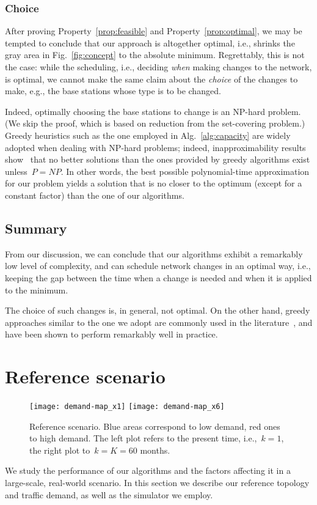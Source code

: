 \documentclass[10pt,journal,cspaper,compsoc]{IEEEtran}
\newcommand{\Fig}[1]{Fig.~\ref{fig:#1}}
\newcommand{\Alg}[1]{Alg.~\ref{alg:#1}}
\newcommand{\Prop}[1]{Property~\ref{prop:#1}}
\begin{document}
\subsubsection{Choice}

After proving \Prop{feasible} and \Prop{optimal}, we may be tempted to conclude that our approach is altogether optimal,
i.e., shrinks the gray area in \Fig{concept} to the absolute minimum. Regrettably, this is not the case: while the scheduling,
i.e., deciding {\em when} making changes to the network, is optimal, we cannot make the same claim about the {\em choice}
of the changes to make, e.g., the base stations
whose type is to be changed.

Indeed, optimally choosing the base stations to change is an NP-hard problem. (We skip the proof, which is based on reduction
from the set-covering problem.) Greedy heuristics such as the one employed in \Alg{capacity} are widely adopted when dealing with
NP-hard problems; indeed, inapproximability results show~\cite{inapprox} that no better solutions than the ones provided by greedy
algorithms exist unless~$P=NP$.
In other words, the best possible polynomial-time approximation for our problem yields a solution that is no closer to the optimum (except for a constant factor) than the one of our algorithms.

\subsection{Summary}

From our discussion, we can conclude that our algorithms exhibit a remarkably low level of complexity, and can schedule
network changes in an optimal way, i.e., keeping the gap between the time when a change is needed and when it is applied to the
minimum.

The choice of such changes is, in general, not optimal. On the other hand, greedy approaches similar to
the one we adopt are commonly used in the literature~\cite{inapprox}, and have been shown to perform remarkably well in practice.

\section{Reference scenario}
\label{sec:scenario}

\begin{figure}
\centering
\texttt{[image: demand-map\_x1]}
\texttt{[image: demand-map\_x6]}
\caption{
Reference scenario. Blue areas correspond to low demand, red ones to high demand.
The left plot refers to the present time, i.e.,~$k=1$, the right plot to~$k=K=60$
months.
\label{fig:scenario}
}
\end{figure}
We study the performance of our algorithms and the factors affecting it in a large-scale, real-world scenario.
In this section we describe our reference topology and traffic demand, as well as the simulator we employ.
\end{document}
